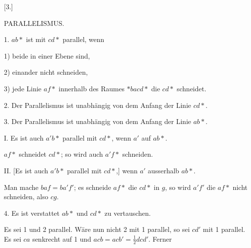 \begin{center}
[3.]

PARALLELISMUS.
\end{center}

1. $ab\ast $ ist mit $cd\ast $ parallel, wenn

1) beide in einer Ebene sind,

2) einander nicht schneiden,

3) jede Linie $af\ast $ innerhalb des Raumes $\ast bacd\ast $ die $cd\ast $ schneidet.

\begin{center}

\end{center}

2. Der Parallelismus ist unabhängig von dem Anfang der Linie $cd\ast $.

3. Der Parallelismus ist unabhängig von dem Anfang der Linie $ab\ast $.

I. Es ist auch $a'b\ast $ parallel mit $cd\ast $, wenn $a'$ auf $ab\ast $.

 $af\ast $ schneidet $cd\ast $; so wird auch $a'f\ast $ schneiden.

II. [Es ist auch $a'b\ast $ parallel mit $cd\ast $,] wenn $a'$ ausserhalb $ab\ast $.

\begin{center}

\end{center}

Man mache $baf = ba'f'$; es schneide $af\ast $ die $cd\ast $ in $g$, so wird $a'f'$ die $af\ast $ nicht schneiden, also $cg$.

4. Es ist verstattet $ab\ast $ und $cd\ast $ zu vertauschen.

\begin{center}

\end{center}

Es sei 1 und 2 parallel. Wäre nun nicht 2 mit 1 parallel, so sei $cd'$ mit 1 parallel. Es sei $ca$ senkrecht auf 1 und $acb = acb' = \frac{1}{2}dcd'$. Ferner
